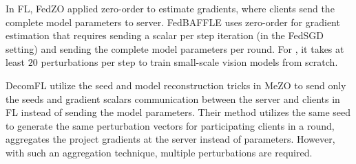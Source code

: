 In \ac{FL}, FedZO \cite{fang2022communication} applied zero-order to estimate gradients, where clients send the complete model parameters to server. FedBAFFLE \cite{baffle} uses zero-order for gradient estimation that requires sending a scalar per step iteration (in the FedSGD setting) and sending the complete model parameters per round. For \cite{baffle, fang2022communication}, it takes at least $20$ perturbations per step to train small-scale vision models from scratch. 

 DecomFL \cite{decomfl_cite} utilize the seed and model reconstruction tricks in MeZO to send only the seeds and gradient scalars communication between the server and clients in \ac{FL} instead of sending the model parameters. Their method utilizes the same seed to generate the same perturbation vectors for participating clients in a round, aggregates the project gradients at the server instead of parameters. However, with such an aggregation technique, multiple perturbations are required.

